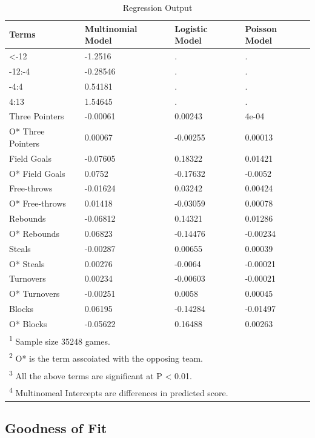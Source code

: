 \documentclass[
  man,floatsintext]{apa6}
\begin{document}
\begin{longtable}[t]{llll}
\caption{\label{tab:unnamed-chunk-5}Regression Output}\\
\toprule
Terms & Multinomial Model & Logistic Model & Poisson Model\\
\midrule
<-12 & -1.2516 & . & .\\
-12:-4 & -0.28546 & . & .\\
-4:4 & 0.54181 & . & .\\
4:13 & 1.54645 & . & .\\
Three Pointers & -0.00061 & 0.00243 & 4e-04\\
\addlinespace
O* Three Pointers & 0.00067 & -0.00255 & 0.00013\\
Field Goals & -0.07605 & 0.18322 & 0.01421\\
O* Field Goals & 0.0752 & -0.17632 & -0.0052\\
Free-throws & -0.01624 & 0.03242 & 0.00424\\
O* Free-throws & 0.01418 & -0.03059 & 0.00078\\
\addlinespace
Rebounds & -0.06812 & 0.14321 & 0.01286\\
O* Rebounds & 0.06823 & -0.14476 & -0.00234\\
Steals & -0.00287 & 0.00655 & 0.00039\\
O* Steals & 0.00276 & -0.0064 & -0.00021\\
Turnovers & 0.00234 & -0.00603 & -0.00021\\
\addlinespace
O* Turnovers & -0.00251 & 0.0058 & 0.00045\\
Blocks & 0.06195 & -0.14284 & -0.01497\\
O* Blocks & -0.05622 & 0.16488 & 0.00263\\
\bottomrule
\multicolumn{4}{l}{\rule{0pt}{1em}\textsuperscript{1} Sample size 35248 games.}\\
\multicolumn{4}{l}{\rule{0pt}{1em}\textsuperscript{2} O* is the term asscoiated with the opposing team.}\\
\multicolumn{4}{l}{\rule{0pt}{1em}\textsuperscript{3} All the above terms are significant at P < 0.01.}\\
\multicolumn{4}{l}{\rule{0pt}{1em}\textsuperscript{4} Multinomeal Intercepts are differences in predicted score.}\\
\end{longtable}

\hypertarget{goodness-of-fit}{%
\subsection{Goodness of Fit}\label{goodness-of-fit}}
\end{document}
